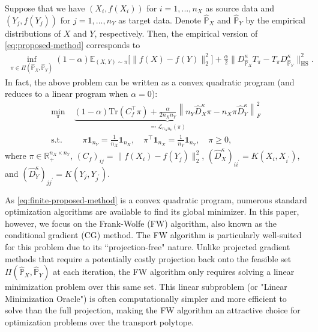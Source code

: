 \documentclass{article}
\begin{document}
Suppose that we have $(X_i,f(X_i))$ for $i=1,...,n_X$ as source data and $(Y_j,f(Y_j))$ for $j=1,...,n_Y$ as target data. Denote $\hat{\mathbb{P}}_X$ and $\hat{\mathbb{P}}_Y$ by the empirical distributions of $X$ and $Y$, respectively. Then, the empirical version of \eqref{eq:proposed-method} corresponds to
\begin{align*}
	\inf_{\pi \in \Pi(\hat{\mathbb{P}}_X,\hat{\mathbb{P}}_Y)} (1-\alpha)\mathbb{E}_{(X,Y)\sim\pi}\big[\|f(X)-f(Y)\|_2^2\big] + \frac{\alpha}{2} \| D_{\hat{\mathbb{P}}_X}^{\kappa}T_\pi - T_\pi D_{\hat{\mathbb{P}}_Y}^{\kappa} \|_{\mathrm{HS}}^2 .
\end{align*}
In fact, the above problem can be written as a convex quadratic program (and reduces to a linear program when $\alpha = 0$):
\begin{align}
	\label{eq:finite-proposed-method}
	\min_{\pi}\; &\underbrace{(1-\alpha)\mathrm{Tr}\left(C_f^\top \pi\right) + \frac{\alpha}{2n_Xn_Y} \left\| n_Y \hat{D}^{\kappa}_X \pi - n_X \pi \hat{D}^{\kappa}_Y \right\|_F^2}_{\eqqcolon \mathcal{L}_{n_Xn_Y}(\pi)} \nonumber\\
	\mathrm{s.t.}&\quad \pi\mathbf{1}_{n_Y} = \frac{1}{n_X} \mathbf{1}_{n_X} , \quad \pi^\top \mathbf{1}_{n_X} = \frac{1}{n_Y} \mathbf{1}_{n_Y} , \quad \pi \geq 0 ,
\end{align}
where $\pi \in \mathbb{R}_{+}^{n_X \times n_Y}$, $(C_f)_{ij} = \|f(X_i) - f(Y_j)\|_2^2$, $(\hat{D}^{\kappa}_X)_{ii^\prime} = K(X_i,X_{i^\prime})$, and $(\hat{D}^{\kappa}_Y)_{jj^\prime} = K(Y_j,Y_{j^\prime})$.

As \eqref{eq:finite-proposed-method} is a convex quadratic program, numerous standard optimization algorithms are available to find its global minimizer. In this paper, however, we focus on the Frank-Wolfe (FW) algorithm, also known as the conditional gradient (CG) method. The FW algorithm is particularly well-suited for this problem due to its ``projection-free" nature. Unlike projected gradient methods that require a potentially costly projection back onto the feasible set $\Pi(\hat{\mathbb{P}}_X,\hat{\mathbb{P}}_Y)$ at each iteration, the FW algorithm only requires solving a linear minimization problem over this same set. This linear subproblem (or "Linear Minimization Oracle") is often computationally simpler and more efficient to solve than the full projection, making the FW algorithm an attractive choice for optimization problems over the transport polytope.
\end{document}
